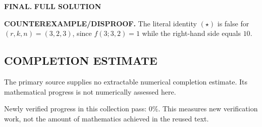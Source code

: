 \medskip
\noindent\textbf{FINAL.}
\textbf{FULL SOLUTION}

\textbf{COUNTEREXAMPLE/DISPROOF.}
The literal identity $(\star)$ is false for $(r,k,n)=(3,2,3)$, since $f(3;3,2)=1$ while the right-hand side equals $10$.




\subsection*{COMPLETION ESTIMATE}
The primary source supplies no extractable numerical completion estimate. Its mathematical progress is not numerically assessed here.

Newly verified progress in this collection pass: $0\%$. This measures new verification work, not the amount of mathematics achieved in the reused text.
